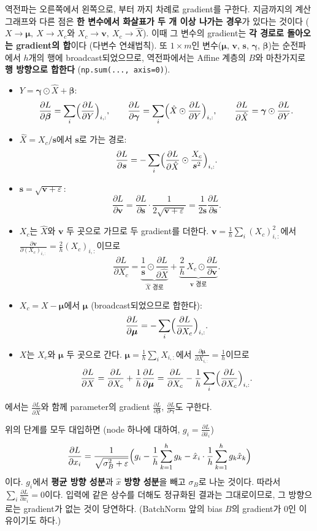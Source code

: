 \documentclass[11pt,a4paper]{article}
\newcommand{\pd}[2]{\frac{\partial #1}{\partial #2}}
\begin{document}
역전파는 오른쪽에서 왼쪽으로, 부터 까지 차례로 gradient를 구한다.
지금까지의 계산 그래프와 다른 점은 \textbf{한 변수에서 화살표가 두 개 이상 나가는 경우}가 있다는 것이다
($X\to\bm\mu,\ X\to X_c$와 $X_c\to\bm v,\ X_c\to\hat X$).
이때 그 변수의 gradient는 \textbf{각 경로로 돌아오는 gradient의 합}이다 (다변수 연쇄법칙).
또 $1\times m$인 변수($\bm\mu$, $\bm v$, $\bm s$, $\bm\gamma$, $\bm\beta$)는 순전파에서 $h$개의 행에 broadcast되었으므로,
역전파에서는 Affine 계층의 $B$와 마찬가지로 \textbf{행 방향으로 합한다} (\texttt{np.sum(..., axis=0)}).

\begin{itemize}[leftmargin=2.2em,itemsep=0.5em]
\item[\ding{173}] $Y=\bm\gamma\odot\hat X+\bm\beta$:
\[
\pd{L}{\bm\beta}=\sum_{i}\Bigl(\pd{L}{Y}\Bigr)_{i,:},\qquad
\pd{L}{\bm\gamma}=\sum_{i}\Bigl(\hat X\odot\pd{L}{Y}\Bigr)_{i,:},\qquad
\pd{L}{\hat X}=\bm\gamma\odot\pd{L}{Y}.
\]
\item[\ding{174}] $\hat X=X_c/\bm s$에서 $\bm s$로 가는 경로:
\[
\pd{L}{\bm s}=-\sum_i\Bigl(\pd{L}{\hat X}\odot\frac{X_c}{\bm s^2}\Bigr)_{i,:}.
\]
\item[\ding{175}] $\bm s=\sqrt{\bm v+\varepsilon}$:
\[
\pd{L}{\bm v}=\pd{L}{\bm s}\cdot\frac{1}{2\sqrt{\bm v+\varepsilon}}=\frac{1}{2\bm s}\pd{L}{\bm s}.
\]
\item[\ding{176}] $X_c$는 $\hat X$와 $\bm v$ 두 곳으로 가므로 두 gradient를 더한다.
$\bm v=\frac1h\sum_i (X_c)_{i,:}^2$에서 $\pd{\bm v}{(X_c)_{i,:}}=\frac2h(X_c)_{i,:}$이므로
\[
\pd{L}{X_c}=\underbrace{\frac{1}{\bm s}\odot\pd{L}{\hat X}}_{\hat X\text{ 경로}}
+\underbrace{\frac2h\,X_c\odot\pd{L}{\bm v}}_{\bm v\text{ 경로}}.
\]
\item[\ding{177}] $X_c=X-\bm\mu$에서 $\bm\mu$ (broadcast되었으므로 합한다):
\[
\pd{L}{\bm\mu}=-\sum_i\Bigl(\pd{L}{X_c}\Bigr)_{i,:}.
\]
\item[\ding{178}] $X$는 $X_c$와 $\bm\mu$ 두 곳으로 간다. $\bm\mu=\frac1h\sum_iX_{i,:}$에서 $\pd{\bm\mu}{X_{i,:}}=\frac1h$이므로
\[
\pd{L}{X}=\pd{L}{X_c}+\frac1h\pd{L}{\bm\mu}
=\pd{L}{X_c}-\frac1h\sum_i\Bigl(\pd{L}{X_c}\Bigr)_{i,:}.
\]
\end{itemize}
에서는 $\pd{L}{\hat X}$와 함께 parameter의 gradient $\pd{L}{\bm\beta}$, $\pd{L}{\bm\gamma}$도 구한다.

\begin{remarkbox}[한 줄로 정리한 $\pd{L}{X}$]
위의 단계를 모두 대입하면 (node 하나에 대하여, $g_i=\pd{L}{\hat x_i}$)
\[
\pd{L}{x_i}=\frac{1}{\sqrt{\sigma_B^2+\varepsilon}}
\Bigl(g_i-\frac1h\sum_{k=1}^{h}g_k-\hat x_i\cdot\frac1h\sum_{k=1}^{h}g_k\hat x_k\Bigr)
\]
이다. $g_i$에서 \textbf{평균 방향 성분}과 \textbf{$\hat x$ 방향 성분}을 빼고 $\sigma_B$로 나눈 것이다.
따라서 $\sum_i\pd{L}{x_i}=0$이다. 입력에 같은 상수를 더해도 정규화된 결과는 그대로이므로,
그 방향으로는 gradient가 없는 것이 당연하다. (BatchNorm 앞의 bias $B$의 gradient가 $0$인 이유이기도 하다.)
\end{remarkbox}
\end{document}
